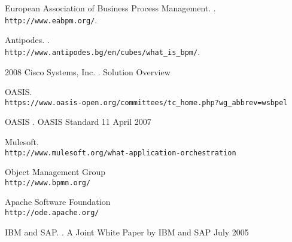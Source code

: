 \documentclass[11pt]{aghdpl}
\author{Tomasz Landowski}
\date{2014}
\begin{document}
\titlepages
\setcounter{tocdepth}{3}
\tableofcontents
\clearpage








\begin{thebibliography}{1}

%
%

European Association of Business Process Management.
.
\newblock \\\texttt{http://www.eabpm.org/}.


Antipodes.
.
\newblock \\\texttt{http://www.antipodes.bg/en/cubes/what\_is\_bpm/}.

2008 Cisco Systems, Inc.
.
\newblock Solution Overview 


OASIS.
\newblock \\\texttt{https://www.oasis-open.org/committees/tc\_home.php?wg\_abbrev=wsbpel}

OASIS
.
\newblock OASIS Standard 11 April 2007 

Mulesoft.
\newblock \\\texttt{http://www.mulesoft.org/what-application-orchestration}

Object Management Group
\newblock \\\texttt{http://www.bpmn.org/}

Apache Software Foundation
\newblock \\\texttt{http://ode.apache.org/}

IBM and SAP.
.
\newblock A Joint White Paper by IBM and SAP July 2005 


\end{thebibliography}
\end{document}
